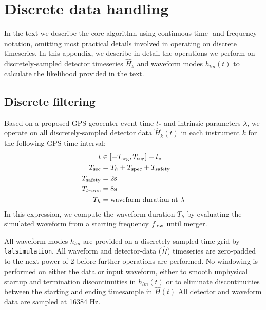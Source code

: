 \documentclass[twocolumn,prd,nofootinbib]{revtex4}
\newcommand\unit[1]{{\rm #1}}
\begin{document}
\section{Discrete data handling}
\label{ap:DiscreteData}

In the text we describe the core algorithm using continuous time- and frequency notation, omitting most practical
details involved in operating on discrete timeseries.  In this appendix, we describe in detail the operations we perform
on discretely-sampled detector timeseries $\hat{H}_k$  and  waveform modes $h_{lm}(t)$ to calculate the likelihood
provided in the text.

\subsection{Discrete filtering}

Based on a proposed GPS geocenter event time $t_*$ and intrinsic parameters $\lambda$, we operate on all discretely-sampled detector
data $\hat{H}_k(t)$  in each instrument $k$ for the following GPS time interval:
\begin{align}
t &\in [-T_{\rm seg},T_{\rm seg}]+t_{*} \\
T_{\rm sec} &= T_h+T_{\rm spec} +T_{\rm safety} \\
T_{\rm safety} &= 2\unit{s} \\
 T_{trunc} &= 8 \unit{s} \\
T_h &= \text{waveform duration at }\lambda
\end{align}
In this expression, we compute the waveform duration $T_h$ by evaluating the simulated waveform from a starting
frequency $f_{\rm low}$ until merger. 

All waveform modes $h_{lm}$ are provided on a discretely-sampled time grid by \texttt{lalsimulation}.  
%
All waveform and detector-data ($\hat{H}$) timeseries are zero-padded to the next power of 2 before further operations are
performed.  
%
No windowing is performed on either the data or input waveform, either to smooth unphysical startup and termination
discontinuities in $h_{lm}(t)$ or to eliminate discontinuities between the starting and ending timesample in $\hat{H}(t)$
%
All detector and waveform data are sampled at 16384 Hz.  
%
\end{document}
